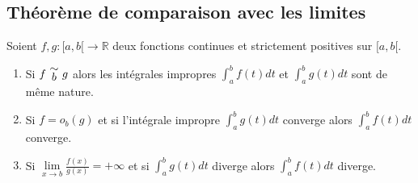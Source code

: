 \documentclass[a4paper,10pt]{book} %
\newcommand{\R}{\mathbb{R}}
\newcommand{\equi}[1]{\renewcommand{\arraystretch}{0.3}~\begin{matrix}\sim\\#1\end{matrix}~\renewcommand{\arraystretch}{1}}
\newcommand{\displayAmath}{\displaystyle}
\begin{document}
\subsection{Théorème de comparaison avec les limites}
Soient $f,g : [a,b[ \rightarrow \R$ deux fonctions continues et strictement positives sur $[a,b[$.

\begin{enumerate}
\item Si $f\equi{b}g$ alors les intégrales impropres $\displayAmath \int_a^bf(t)dt$ et $\displayAmath \int_a^b g(t)dt$ sont de même nature.

\item Si $f=o_b(g)$ et si l'intégrale impropre $\displayAmath \int_a^bg(t)dt$ converge alors $\displayAmath \int_a^bf(t)dt$ converge.

\item Si $\lim\limits_{x\rightarrow b}\frac{f(x)}{g(x)}=+\infty$ et si $\displayAmath \int_a^bg(t)dt$ diverge alors $\displayAmath \int_a^bf(t)dt$ diverge.
\end{enumerate}
\end{document}
